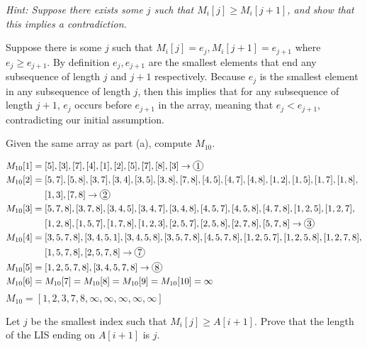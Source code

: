\documentclass[11pt]{article}
\newcommand{\circled}[2]{%
    \tikz[baseline=(char.base)]{\node[draw, circle, inner sep=1pt] (char) {#1};}%
    }
\begin{document}
\begin{subparts}
    \emph{Hint: Suppose there exists some $j$ such that $M_i[j] \geq M_i[j+1]$, and show that this implies a contradiction.}\\
    \begin{solution}
        Suppose there is some $j$ such that $M_i[j]=e_j, M_i[j+1] = e_{j+1}$ where $e_j \geq e_{j+1}$. By definition $e_j, e_{j+1}$ are the 
        smallest elements that end any subsequence of length $j$ and $j+1$ respectively. Because $e_j$ is the smallest element in any subsequence of length $j$, then
        this implies that for any subsequence of length $j+1$, $e_j$ occurs before $e_{j+1}$ in the array, meaning that $e_j < e_{j+1}$, contradicting our initial assumption.
    \end{solution}
    \subpart Given the same array as part (a), compute $M_{10}$.\\
    \begin{solution}
        \begin{align*}
            M_{10}[1] &= [5], [3], [7], [4], [1], [2], [5], [7], [8], [3] \rightarrow \circled{1}{}\\
            M_{10}[2] &= [5, 7], [5, 8], [3, 7], [3, 4], [3, 5], [3, 8], [7, 8], [4, 5], [4, 7], [4, 8], [1, 2], [1, 5], [1, 7], [1, 8],\\ 
                   &~~~~   [1, 3], [7, 8] \rightarrow \circled{2}{}\\
            M_{10}[3] &= [5, 7, 8], [3, 7, 8], [3, 4, 5], [3, 4, 7], [3, 4, 8], [4, 5, 7], [4, 5, 8], [4, 7, 8], [1, 2, 5], [1, 2, 7],\\
                   &~~~~ [1, 2, 8], [1, 5, 7], [1, 7, 8], [1, 2, 3], [2, 5, 7], [2, 5, 8], [2, 7, 8], [5, 7, 8] \rightarrow \circled{3}{}\\
            M_{10}[4] &= [3, 5, 7, 8], [3, 4, 5, 1], [3, 4, 5, 8], [3, 5, 7, 8], [4, 5, 7, 8], [1, 2, 5, 7], [1, 2, 5, 8], [1, 2, 7, 8],\\
                   &~~~~ [1, 5, 7, 8], [2, 5, 7, 8]\rightarrow \circled{7}{}\\
            M_{10}[5] &= [1, 2, 5, 7, 8], [3, 4, 5, 7, 8] \rightarrow \circled{8}{}\\
            M_{10}[6] &= M_{10}[7] = M_{10}[8] = M_{10}[9] = M_{10}[10] = \infty
        \end{align*}
        $M_{10} = [1, 2, 3, 7, 8, \infty, \infty, \infty, \infty, \infty]$
    \end{solution}
    \subpart Let $j$ be the smallest index such that $M_i[j] \geq A[i + 1]$. Prove that the length of the LIS ending on $A[i + 1]$ is $j$. \\

\end{subparts}
\end{document}
